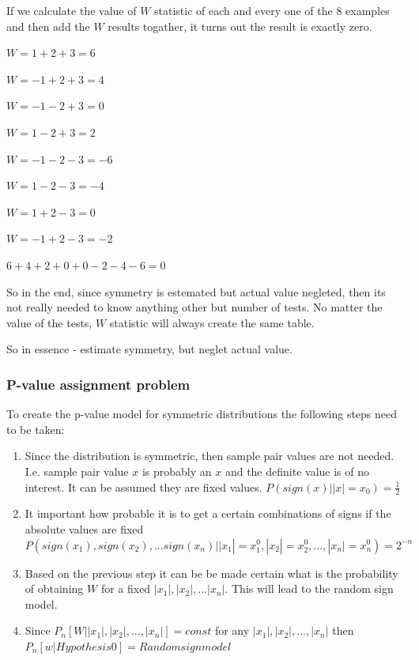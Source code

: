 \documentclass[12pt]{article}
\begin{document}
If we calculate the value of $W$ statistic of each and every one of the 8 examples and then add the $W$ results togather, it turns out the result is exactly zero.

$W = 1 + 2 + 3 = 6$

$W = -1 + 2 + 3 = 4$

$W = -1 - 2 + 3 = 0$

$W = 1 - 2 + 3 = 2$

$W = -1 - 2 - 3 = -6$

$W = 1 - 2 - 3 = -4$

$W = 1 + 2 - 3 = 0$

$W = -1 + 2 - 3 = -2$

$6 + 4 + 2 + 0 + 0 -2 - 4 - 6 = 0$

So in the end, since symmetry is estemated but actual value negleted, then its not really needed to know anything other but number of tests. No matter the value of the tests, $W$ statistic will always create the same table.

So in essence - estimate symmetry, but neglet actual value.

\subsubsection{P-value assignment problem}

To create the p-value model for symmetric distributions the following steps need to be taken:

\begin{enumerate}
\item Since the distribution is symmetric, then sample pair values are not needed. I.e. sample pair value $x$ is probably an $x$ and the definite value is of no interest. It can be assumed they are fixed values.
$P(sign(x) | |x| = x_0) = \frac{1}{2}$

\item It important how probable it is to get a certain combinations of signs if the absolute values are fixed $P(sign(x_1), sign(x_2), ... sign(x_n) | |x_1| = x_1^0, |x_2| = x_2^0, ..., |x_n| = x_n^0) = 2^{-n}$

\item Based on the previous step it can be be made certain what is the probability of obtaining $W$ for a fixed $|x_1|, |x_2|, ... |x_n|$. This will lead to the random sign model.

\item Since $P_n[W | |x_1|, |x_2|, ..., |x_n|] = const$ for any $|x_1|, |x_2|, ..., |x_n|$ then $P_n[w | Hypothesis 0] = Random sign model$

\end{enumerate}
\end{document}

